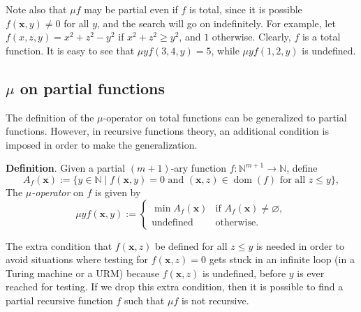 \documentclass[12pt]{article}
\begin{document}
Note also that $\mu f$ may be partial even if $f$ is total, since it is possible $f(\boldsymbol{x},y)\ne 0$ for all $y$, and the search will go on indefinitely.  For example, let $f(x,z,y)= x^2+z^2 - y^2$ if $x^2+z^2 \ge y^2$, and $1$ otherwise.  Clearly, $f$ is a total function.  It is easy to see that $\mu y f(3,4,y) = 5$, while $\mu y f(1,2,y)$ is undefined.

\subsection*{$\mu$ on partial functions}

The definition of the $\mu$-operator on total functions can be generalized to partial functions.  However, in recursive functions theory, an additional condition is imposed in order to make the generalization.

\textbf{Definition}.  Given a partial $(m+1)$-ary function $f:\mathbb{N}^{m+1}\to \mathbb{N}$, define $$A_f(\boldsymbol{x}):=\lbrace y \in \mathbb{N} \mid f(\boldsymbol{x},y)=0 \mbox{ and }(\boldsymbol{x},z) \in \operatorname{dom}(f) \mbox{ for all }z\le y\rbrace,$$
The \emph{$\mu$-operator} on $f$ is given by 
\begin{displaymath}
\mu y f(\boldsymbol{x},y) := \left\{
\begin{array}{ll}
\min A_f(\boldsymbol{x}) & \textrm{if } A_f(\boldsymbol{x})\ne \varnothing, \\
\textrm{undefined} & \textrm{otherwise.}
\end{array}
\right.
\end{displaymath}

The extra condition that $f(\boldsymbol{x},z)$ be defined for all $z\le y$ is needed in order to avoid situations where testing for $f(\boldsymbol{x},z)=0$ gets stuck in an infinite loop (in a Turing machine or a URM) because $f(\boldsymbol{x},z)$ is undefined, before $y$ is ever reached for testing.  If we drop this extra condition, then it is possible to find a partial recursive function $f$ such that $\mu f$ is not recursive.
\end{document}
